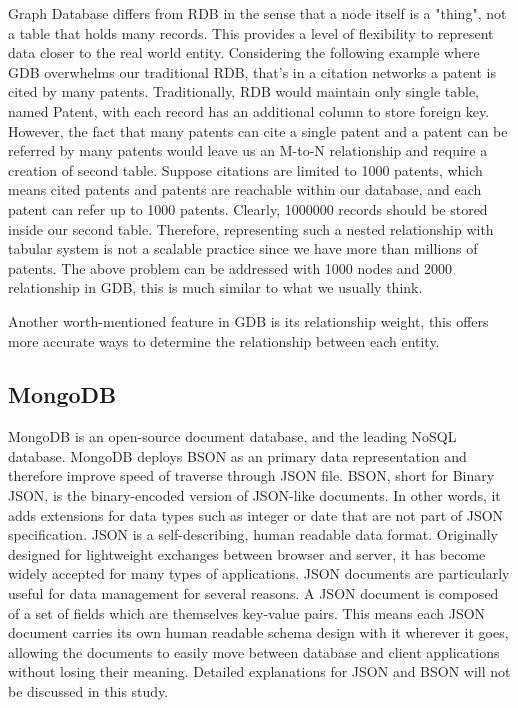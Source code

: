 \documentclass{sig-alternate}
\begin{document}
{Graph Database differs from RDB in the sense that a node itself is a "thing", not a table that holds many records. This provides a level of flexibility to represent data closer to the real world entity. Considering the following example where GDB overwhelms our traditional RDB, that's in a citation networks a patent is cited by many patents. Traditionally, RDB would maintain only single table, named Patent, with each record has an additional column to store foreign key. However, the fact that many patents can cite a single patent and a patent can be referred by many patents would leave us an M-to-N relationship and require a creation of second table. Suppose citations are limited to 1000 patents, which means cited patents and patents are reachable within our database, and each patent can refer up to 1000 patents. Clearly, 1000000 records should be stored inside our second table. Therefore, representing such a nested relationship with tabular system is not a scalable practice since we have more than millions of patents. The above problem can be addressed with 1000 nodes and 2000 relationship in GDB, this is much similar to what we usually think.

Another worth-mentioned feature in GDB is its relationship weight, this offers more accurate ways to determine the relationship between each entity. 

\subsection{MongoDB}
MongoDB  is an open-source document database, and the leading NoSQL database. MongoDB deploys BSON as an primary data representation and therefore improve speed of traverse through JSON file. BSON, short for Binary JSON, is the binary-encoded version of JSON-like documents. In other words, it adds extensions for data types such as integer or date that are not part of JSON specification. JSON is a self-describing, human readable data format. Originally designed for lightweight exchanges between browser and server, it has become widely accepted for many types of applications. JSON documents are particularly useful for data management for several reasons. A JSON document is composed of a set of fields which are themselves key-value pairs. This means each JSON document carries its own human readable schema design with it wherever it goes, allowing the documents to easily move between database and client applications without losing their meaning. Detailed explanations for JSON and BSON will not be discussed in this study.

}
\end{document}

